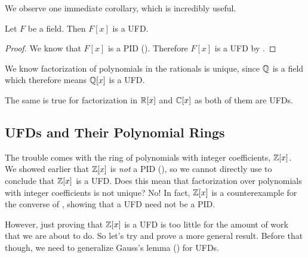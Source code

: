 We observe one immediate corollary, which is incredibly useful.

\begin{corollary}\label{corollary-polynomial-ring-over-field-is-UFD}
    Let $F$ be a field. Then $F[x]$ is a UFD.
\end{corollary}
\begin{proof}
    We know that $F[x]$ is a PID (). Therefore $F[x]$ is a UFD by .
\end{proof}

\begin{example}
    We know factorization of polynomials in the rationals is unique, since $\mathbb{Q}$ is a field which therefore means $\mathbb{Q}[x]$ is a UFD.
\end{example}
\begin{example}
    The same is true for factorization in $\mathbb{R}[x]$ and $\mathbb{C}[x]$ as both of them are UFDs.
\end{example}

\subsection{UFDs and Their Polynomial Rings}
The trouble comes with the ring of polynomials with integer coefficients, $\mathbb{Z}[x]$. We showed earlier that $\mathbb{Z}[x]$ is \textit{not} a PID (), so we cannot directly use  to conclude that $\mathbb{Z}[x]$ is a UFD. Does this mean that factorization over polynomials with integer coefficients is not unique? No! In fact, $\mathbb{Z}[x]$ is a counterexample for the converse of , showing that a UFD need not be a PID.

However, just proving that $\mathbb{Z}[x]$ is a UFD is too little for the amount of work that we are about to do. So let's try and prove a more general result. Before that though, we need to generalize Gauss's lemma () for UFDs.

